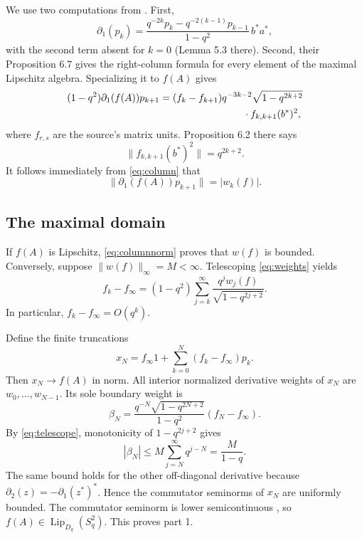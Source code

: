 \documentclass[11pt]{article}
\newcommand{\Lip}{\operatorname{Lip}}
\newcommand{\Sq}{S_q^2}
\numberwithin{equation}{section}
\begin{document}
We use two computations from \cite{AguilarKaad}.  First,
\begin{equation}
 \partial_1(p_k)=\frac{q^{-2k}p_k-q^{-2(k-1)}p_{k-1}}{1-q^2}\,b^*a^*,
                                                               \label{eq:projection}
\end{equation}
with the second term absent for $k=0$ (Lemma 5.3 there).  Second, their
Proposition 6.7 gives the right-column formula for every element of the
maximal Lipschitz algebra.  Specializing it to $f(A)$ gives
\begin{equation}
 \begin{split}
 (1-q^2)\partial_1(f(A))p_{k+1}
   ={}&(f_k-f_{k+1})q^{-3k-2}\sqrt{1-q^{2k+2}}\\
     &\hspace{25mm}\cdot f_{k,k+1}(b^*)^2 ,
 \end{split}                                                    \label{eq:column}
\end{equation}
where $f_{r,s}$ are the source's matrix units.  Proposition 6.2 there says
\[
 \|f_{k,k+1}(b^*)^2\|=q^{2k+2}.
\]
It follows immediately from \eqref{eq:column} that
\begin{equation}
 \|\partial_1(f(A))p_{k+1}\|=|w_k(f)|.                         \label{eq:columnnorm}
\end{equation}

\subsection*{The maximal domain}

If $f(A)$ is Lipschitz, \eqref{eq:columnnorm} proves that $w(f)$ is bounded.
Conversely, suppose $\|w(f)\|_\infty=M<\infty$.  Telescoping
\eqref{eq:weights} yields
\begin{equation}
 f_k-f_\infty=(1-q^2)\sum_{j=k}^{\infty}
 \frac{q^j w_j(f)}{\sqrt{1-q^{2j+2}}}.                         \label{eq:telescope}
\end{equation}
In particular, $f_k-f_\infty=O(q^k)$.

Define the finite truncations
\[
 x_N=f_\infty1+\sum_{k=0}^N(f_k-f_\infty)p_k.
\]
Then $x_N\to f(A)$ in norm.  All interior normalized derivative weights of
$x_N$ are $w_0,\ldots,w_{N-1}$.  Its sole boundary weight is
\[
 \beta_N=\frac{q^{-N}\sqrt{1-q^{2N+2}}}{1-q^2}(f_N-f_\infty).
\]
By \eqref{eq:telescope}, monotonicity of $1-q^{2j+2}$ gives
\begin{equation}
 |\beta_N|\leq M\sum_{j=N}^{\infty}q^{j-N}=\frac{M}{1-q}.       \label{eq:boundary}
\end{equation}
The same bound holds for the other off-diagonal derivative because
$\partial_2(z)=-\partial_1(z^*)^*$.  Hence the commutator seminorms of
$x_N$ are uniformly bounded.  The commutator seminorm is lower
semicontinuous \cite[Lemma 2.3]{AguilarKaad}, so
$f(A)\in\Lip_{D_q}(\Sq)$.  This proves part 1.
\end{document}
